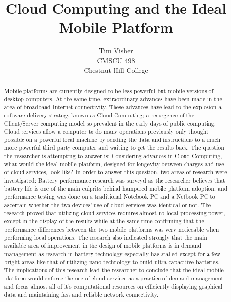 \documentclass[12pt,oneside,letterpaper,titlepage]{report}
\author{Tim Visher\\ CMSCU 498\\ Chestnut Hill College}
\title{Cloud Computing and the Ideal Mobile Platform}
\begin{document}
\maketitle

\tableofcontents

\newpage

\begin{abstract}

Mobile platforms are currently designed to be less powerful but mobile versions
of desktop computers.  At the same time, extraordinary advances have been made
in the area of broadband Internet connectivity.  These advances have lead to the
explosion a software delivery strategy known as Cloud Computing; a resurgence of
the Client/Server computing model so prevalent in the early days of public
computing.  Cloud services allow a computer to do many operations previously
only thought possible on a powerful local machine by sending the data and
instructions to a much more powerful third party computer and waiting to get the
results back.  The question the researcher is attempting to answer is:
Considering advances in Cloud Computing, what would the ideal mobile platform,
designed for longevity between charges and use of cloud services, look like?  In
order to answer this question, two areas of research were investigated: Battery
performance research was surveyd as the researcher believes that battery life is
one of the main culprits behind hampered mobile platform adoption, and
performance testing was done on a traditional Notebook PC and a Netbook PC to
ascertain whether the two devices' use of cloud services was identical or not.
The research proved that utilizing cloud services requires almost no local
processing power, except in the display of the results while at the same time
confirming that the performance differences between the two mobile platforms was
very noticeable when performing local operations.  The research also indicated
strongly that the main available area of improvement in the design of mobile
platforms is in demand management as research in battery technology especially
has stalled except for a few bright areas like that of utilizing nano technology
to build ultra-capacitive batteries.  The implications of this research lead the
researcher to conclude that the ideal mobile platform would enforce the use of
cloud services as a practice of demand management and focus almost all of it's
computational resources on efficiently displaying graphical data and maintaining
fast and reliable network connectivity.

\end{abstract}
\end{document}
